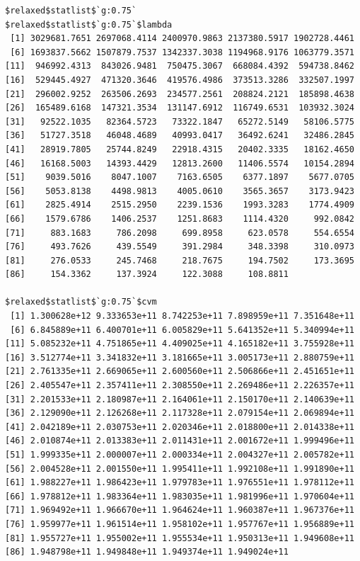 \documentclass[
]{article}
\begin{document}
\begin{verbatim}
$relaxed$statlist$`g:0.75`
$relaxed$statlist$`g:0.75`$lambda
 [1] 3029681.7651 2697068.4114 2400970.9863 2137380.5917 1902728.4461
 [6] 1693837.5662 1507879.7537 1342337.3038 1194968.9176 1063779.3571
[11]  946992.4313  843026.9481  750475.3067  668084.4392  594738.8462
[16]  529445.4927  471320.3646  419576.4986  373513.3286  332507.1997
[21]  296002.9252  263506.2693  234577.2561  208824.2121  185898.4638
[26]  165489.6168  147321.3534  131147.6912  116749.6531  103932.3024
[31]   92522.1035   82364.5723   73322.1847   65272.5149   58106.5775
[36]   51727.3518   46048.4689   40993.0417   36492.6241   32486.2845
[41]   28919.7805   25744.8249   22918.4315   20402.3335   18162.4650
[46]   16168.5003   14393.4429   12813.2600   11406.5574   10154.2894
[51]    9039.5016    8047.1007    7163.6505    6377.1897    5677.0705
[56]    5053.8138    4498.9813    4005.0610    3565.3657    3173.9423
[61]    2825.4914    2515.2950    2239.1536    1993.3283    1774.4909
[66]    1579.6786    1406.2537    1251.8683    1114.4320     992.0842
[71]     883.1683     786.2098     699.8958     623.0578     554.6554
[76]     493.7626     439.5549     391.2984     348.3398     310.0973
[81]     276.0533     245.7468     218.7675     194.7502     173.3695
[86]     154.3362     137.3924     122.3088     108.8811

$relaxed$statlist$`g:0.75`$cvm
 [1] 1.300628e+12 9.333653e+11 8.742253e+11 7.898959e+11 7.351648e+11
 [6] 6.845889e+11 6.400701e+11 6.005829e+11 5.641352e+11 5.340994e+11
[11] 5.085232e+11 4.751865e+11 4.409025e+11 4.165182e+11 3.755928e+11
[16] 3.512774e+11 3.341832e+11 3.181665e+11 3.005173e+11 2.880759e+11
[21] 2.761335e+11 2.669065e+11 2.600560e+11 2.506866e+11 2.451651e+11
[26] 2.405547e+11 2.357411e+11 2.308550e+11 2.269486e+11 2.226357e+11
[31] 2.201533e+11 2.180987e+11 2.164061e+11 2.150170e+11 2.140639e+11
[36] 2.129090e+11 2.126268e+11 2.117328e+11 2.079154e+11 2.069894e+11
[41] 2.042189e+11 2.030753e+11 2.020346e+11 2.018800e+11 2.014338e+11
[46] 2.010874e+11 2.013383e+11 2.011431e+11 2.001672e+11 1.999496e+11
[51] 1.999335e+11 2.000007e+11 2.000334e+11 2.004327e+11 2.005782e+11
[56] 2.004528e+11 2.001550e+11 1.995411e+11 1.992108e+11 1.991890e+11
[61] 1.988227e+11 1.986423e+11 1.979783e+11 1.976551e+11 1.978112e+11
[66] 1.978812e+11 1.983364e+11 1.983035e+11 1.981996e+11 1.970604e+11
[71] 1.969492e+11 1.966670e+11 1.964624e+11 1.960387e+11 1.967376e+11
[76] 1.959977e+11 1.961514e+11 1.958102e+11 1.957767e+11 1.956889e+11
[81] 1.955727e+11 1.955002e+11 1.955534e+11 1.950313e+11 1.949608e+11
[86] 1.948798e+11 1.949848e+11 1.949374e+11 1.949024e+11


\end{verbatim}
\end{document}
